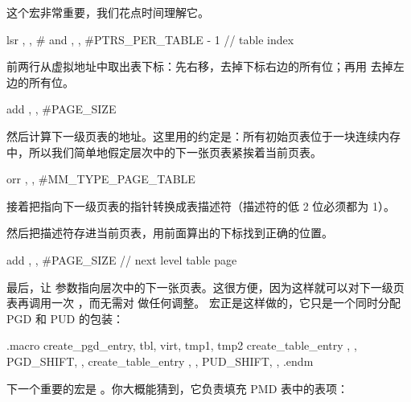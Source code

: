 这个宏非常重要，我们花点时间理解它。

\begin{asmcode}
	lsr	, \virt, #\shift
	and	, , #PTRS_PER_TABLE - 1			// table index
\end{asmcode}

前两行从虚拟地址中取出表下标：先右移，去掉下标右边的所有位；再用  去掉左边的所有位。

\begin{asmcode}
	add	, \tbl, #PAGE_SIZE
\end{asmcode}

然后计算下一级页表的地址。这里用的约定是：所有初始页表位于一块连续内存中，所以我们简单地假定层次中的下一张页表紧挨着当前页表。

\begin{asmcode}
	orr	, , #MM_TYPE_PAGE_TABLE
\end{asmcode}

接着把指向下一级页表的指针转换成表描述符（描述符的低 2 位必须都为 1）。


然后把描述符存进当前页表，用前面算出的下标找到正确的位置。

\begin{asmcode}
	add	\tbl, \tbl, #PAGE_SIZE					// next level table page
\end{asmcode}

最后，让  参数指向层次中的下一张页表。这很方便，因为这样就可以对下一级页表再调用一次 ，而无需对  做任何调整。 宏正是这样做的，它只是一个同时分配 PGD 和 PUD 的包装：

\begin{asmcode}
	.macro	create_pgd_entry, tbl, virt, tmp1, tmp2
	create_table_entry \tbl, \virt, PGD_SHIFT, , 
	create_table_entry \tbl, \virt, PUD_SHIFT, , 
	.endm
\end{asmcode}

下一个重要的宏是 。你大概能猜到，它负责填充 PMD 表中的表项：


